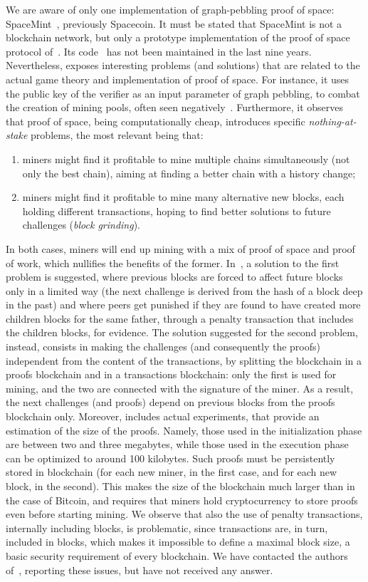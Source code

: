 We are aware of only one implementation of graph-pebbling proof of space:
SpaceMint~\cite{ParkKFGAP18}, previously Spacecoin.
It must be stated that SpaceMint is not a blockchain network,
but only a prototype implementation of the proof of space protocol of~\cite{DziembowskiFKP15}.
Its code~\cite{SpaceMintCode} has not been maintained in the last nine years.
Nevertheless, \cite{ParkKFGAP18} exposes interesting problems (and solutions)
that are related to the actual game theory and implementation of proof of space.
For instance, it uses the public key of the verifier as an input parameter
of graph pebbling, to combat the creation of mining pools, often seen
negatively~\cite{MillerKKS15}.
Furthermore, it observes that proof of space, being computationally cheap, introduces
specific \emph{nothing-at-stake} problems, the most relevant being that:
%
\begin{enumerate}
\item miners might find it profitable to mine multiple chains simultaneously (not only the best chain),
  aiming at finding a better chain with a history change;
\item miners might find it profitable to mine many alternative new blocks, each holding
  different transactions, hoping to find better solutions to future challenges (\emph{block grinding}).
\end{enumerate}
%
In both cases, miners will end up mining with a mix of proof of space and proof of work,
which nullifies the benefits of the former.
In~\cite{ParkKFGAP18}, a solution to the first problem is suggested, where
previous blocks are forced to affect future blocks only in a limited way
(the next challenge is derived from the hash of a block deep in the past)
and where peers get punished if they are found to have
created more children blocks for the same father, through a penalty transaction that
includes the children blocks, for evidence.
The solution suggested for the second problem, instead, consists in making the challenges
(and consequently the proofs) independent from the content of the transactions, by splitting the
blockchain in a proofs blockchain and in a transactions blockchain: only the first is used for mining,
and the two are connected with the signature of the miner.
As a result, the next challenges (and proofs) depend on previous blocks from the proofs blockchain only.
Moreover, \cite{ParkKFGAP18} includes actual experiments, that provide an estimation of the size of the proofs.
Namely, those used in the initialization phase are between two and three megabytes, while those used
in the execution phase can be optimized to around 100 kilobytes. Such proofs must be persistently stored in
blockchain (for each new miner, in the first case, and for each new block, in the second).
This makes the size of the blockchain much larger than in the case of Bitcoin, and requires
that miners hold cryptocurrency to store proofs even before starting mining.
We observe that also the use of penalty transactions, internally including blocks, is problematic, since
transactions are, in turn, included in blocks, which makes it impossible to define
a maximal block size, a basic security requirement of every blockchain.
We have contacted the authors of~\cite{ParkKFGAP18}, reporting these issues,
but have not received any answer.

